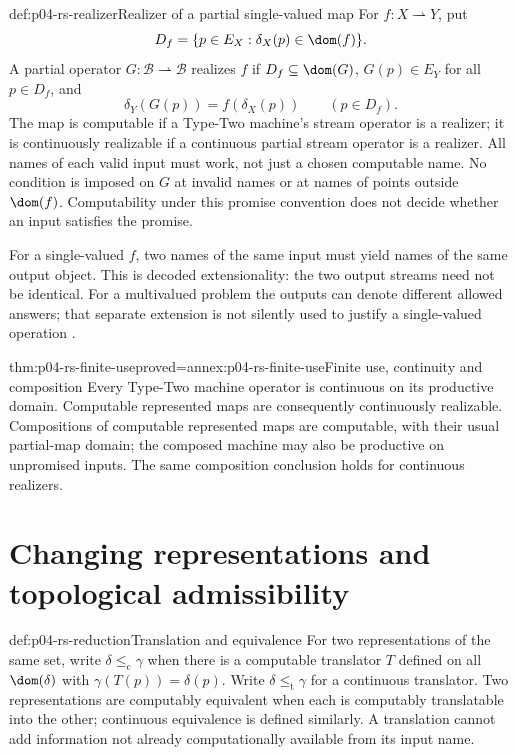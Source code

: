 \begin{hbdefinition}{def:p04-rs-realizer}{Realizer of a partial single-valued map}
For \(f:X\rightharpoonup Y\), put
\[
 D_f=\{p\in E_X:\delta_X(p)\in\dom(f)\}.
\]
A partial operator \(G:\mathcal B\rightharpoonup\mathcal B\)
realizes \(f\) if \(D_f\subseteq\dom(G)\), \(G(p)\in E_Y\)
for all \(p\in D_f\), and
\[
 \delta_Y(G(p))=f(\delta_X(p))\qquad(p\in D_f).
\]
The map is computable if a Type-Two machine's stream operator is
a realizer; it is continuously realizable if a continuous partial
stream operator is a realizer. All names of each valid input must
work, not just a chosen computable name.
No condition is imposed on \(G\) at invalid names or at names of
points outside \(\dom(f)\). Computability under this promise
convention does not decide whether an input satisfies the promise.
\end{hbdefinition}

For a single-valued \(f\), two names of the same input must yield
names of the same output object. This is decoded extensionality:
the two output streams need not be identical.
For a multivalued problem the outputs can denote different allowed
answers; that separate extension is not silently used to justify
a single-valued operation \cite[pp.\ 3--4]{BrattkaHertling1994RelationsRS}.

\begin{hbtheorem}{thm:p04-rs-finite-use}{proved=annex:p04-rs-finite-use}{Finite use, continuity and composition}
Every Type-Two machine operator is continuous on its productive
domain. Computable represented maps are consequently continuously
realizable. Compositions of computable represented maps are
computable, with their usual partial-map domain; the composed
machine may also be productive on unpromised inputs.
The same composition conclusion holds for continuous realizers.
\end{hbtheorem}

\section{Changing representations and topological admissibility}
\label{sec:p04-rs-admissibility}

\begin{hbdefinition}{def:p04-rs-reduction}{Translation and equivalence}
For two representations of the same set, write
\(\delta\leq_{\mathrm c}\gamma\) when there is a computable
translator \(T\) defined on all \(\dom(\delta)\) with
\(\gamma(T(p))=\delta(p)\).
Write \(\delta\leq_{\mathrm t}\gamma\) for a continuous translator.
Two representations are computably equivalent when each is
computably translatable into the other; continuous equivalence
is defined similarly. A translation cannot add information not
already computationally available from its input name.
\end{hbdefinition}

